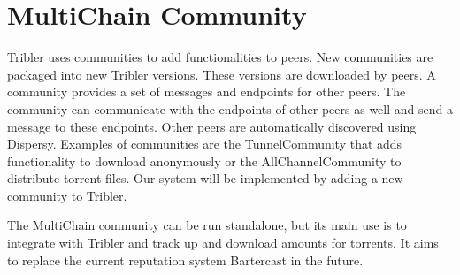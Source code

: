 \section{MultiChain Community}
Tribler uses communities to add functionalities to peers.
New communities are packaged into new Tribler versions.
These versions are downloaded by peers.
A community provides a set of messages and endpoints for other peers.
The community can communicate with the endpoints of other peers as well and send a message to these endpoints.
Other peers are automatically discovered using Dispersy.
Examples of communities are the TunnelCommunity that adds functionality to download anonymously\cite{Plak-anonymous}
or the AllChannelCommunity to distribute torrent files.
Our system will be implemented by adding a new community to Tribler.

The MultiChain community can be run standalone,
but its main use is to integrate with Tribler and track up and download amounts for torrents.
It aims to replace the current reputation system Bartercast in the future.